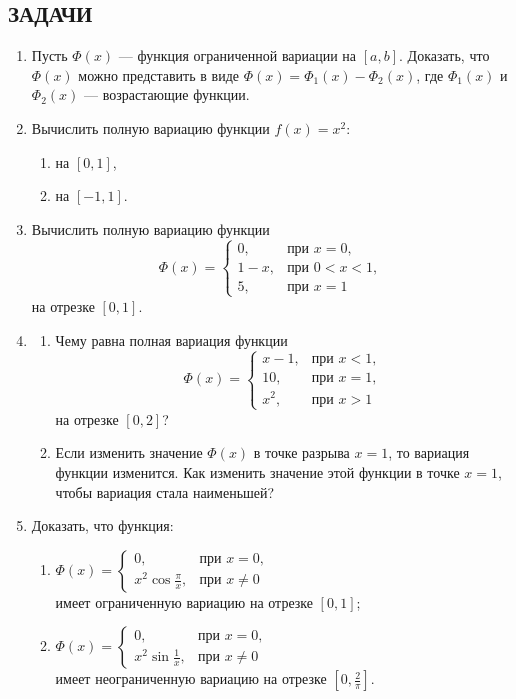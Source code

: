 \documentclass[12pt,a4paper]{article}
\begin{document}
\subsection*{ЗАДАЧИ}
\begin{enumerate}
\item Пусть $\Phi(x)$ — функция ограниченной вариации на $[a, b]$. Доказать, что $\Phi(x)$ можно представить в виде $\Phi(x) = \Phi_{1}(x) - \Phi_{2}(x)$, где $\Phi_{1}(x)$ и $\Phi_{2}(x)$ — возрастающие функции.

\item Вычислить полную вариацию функции $f(x) = x^{2}$:
\begin{enumerate}[label=\alph*)]
\item на $[0, 1]$,
\item на $[-1, 1]$.
\end{enumerate}

\item Вычислить полную вариацию функции
$$\Phi(x) =
\begin{cases} 0, & \text{при } x=0, \\ 1-x, & \text{при } 0<x<1, \\ 5, & \text{при } x=1
\end{cases}$$
на отрезке $[0, 1]$.

\item
\begin{enumerate}[label=\alph*)]
\item Чему равна полная вариация функции
$$\Phi(x) =
\begin{cases} x-1, & \text{при } x<1, \\ 10, & \text{при } x=1, \\ x^{2}, & \text{при } x>1
\end{cases}$$
на отрезке $[0, 2]$?
\item Если изменить значение $\Phi(x)$ в точке разрыва $x=1$, то вариация функции изменится. Как изменить значение этой функции в точке $x=1$, чтобы вариация стала наименьшей?
\end{enumerate}

\item Доказать, что функция:
\begin{enumerate}[label=\alph*)]
\item $\Phi(x) =
\begin{cases} 0, & \text{при } x=0, \\ x^{2} \cos\frac{\pi}{x}, & \text{при } x\ne0
\end{cases}$ \\ имеет ограниченную вариацию на отрезке $[0, 1]$;
\item $\Phi(x) =
\begin{cases} 0, & \text{при } x=0, \\ x^{2} \sin\frac{1}{x}, & \text{при } x\ne0
\end{cases}$ \\ имеет неограниченную вариацию на отрезке $[0, \frac{2}{\pi}]$.
\end{enumerate}


\end{enumerate}
\end{document}
